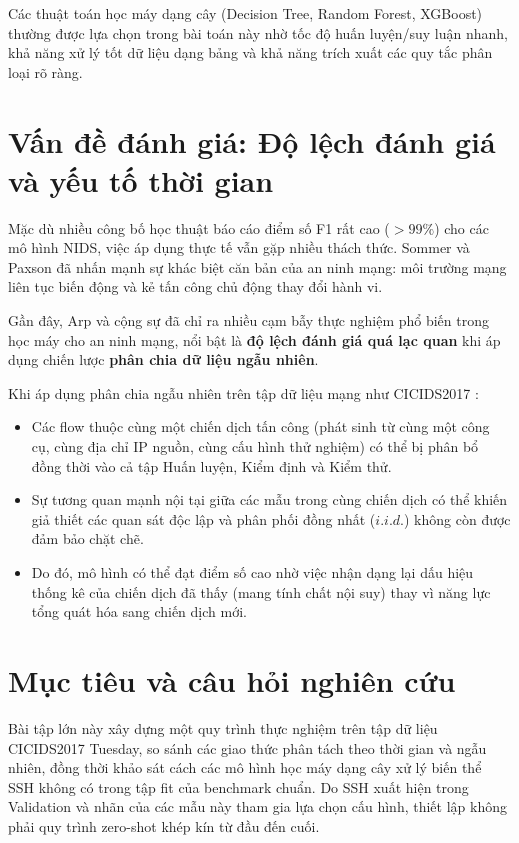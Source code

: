 Các thuật toán học máy dạng cây (Decision Tree, Random Forest, XGBoost) thường được lựa chọn trong bài toán này nhờ tốc độ huấn luyện/suy luận nhanh, khả năng xử lý tốt dữ liệu dạng bảng và khả năng trích xuất các quy tắc phân loại rõ ràng.

\section{Vấn đề đánh giá: Độ lệch đánh giá và yếu tố thời gian}

Mặc dù nhiều công bố học thuật báo cáo điểm số F1 rất cao ($> 99\%$) cho các mô hình NIDS, việc áp dụng thực tế vẫn gặp nhiều thách thức. Sommer và Paxson \cite{sommer2010outside} đã nhấn mạnh sự khác biệt căn bản của an ninh mạng: môi trường mạng liên tục biến động và kẻ tấn công chủ động thay đổi hành vi.

Gần đây, Arp và cộng sự \cite{arp2022dos} đã chỉ ra nhiều cạm bẫy thực nghiệm phổ biến trong học máy cho an ninh mạng, nổi bật là \textbf{độ lệch đánh giá quá lạc quan} khi áp dụng chiến lược \textbf{phân chia dữ liệu ngẫu nhiên}.

Khi áp dụng phân chia ngẫu nhiên trên tập dữ liệu mạng như CICIDS2017 \cite{sharafaldin2018generating}:
\begin{itemize}
    \item Các flow thuộc cùng một chiến dịch tấn công (phát sinh từ cùng một công cụ, cùng địa chỉ IP nguồn, cùng cấu hình thử nghiệm) có thể bị phân bổ đồng thời vào cả tập Huấn luyện, Kiểm định và Kiểm thử.
    \item Sự tương quan mạnh nội tại giữa các mẫu trong cùng chiến dịch có thể khiến giả thiết các quan sát độc lập và phân phối đồng nhất ($i.i.d.$) không còn được đảm bảo chặt chẽ.
    \item Do đó, mô hình có thể đạt điểm số cao nhờ việc nhận dạng lại dấu hiệu thống kê của chiến dịch đã thấy (mang tính chất nội suy) thay vì năng lực tổng quát hóa sang chiến dịch mới.
\end{itemize}

\section{Mục tiêu và câu hỏi nghiên cứu}

Bài tập lớn này xây dựng một quy trình thực nghiệm trên tập dữ liệu CICIDS2017 Tuesday, so sánh các giao thức phân tách theo thời gian và ngẫu nhiên, đồng thời khảo sát cách các mô hình học máy dạng cây xử lý biến thể SSH không có trong tập fit của benchmark chuẩn. Do SSH xuất hiện trong Validation và nhãn của các mẫu này tham gia lựa chọn cấu hình, thiết lập không phải quy trình zero-shot khép kín từ đầu đến cuối.

